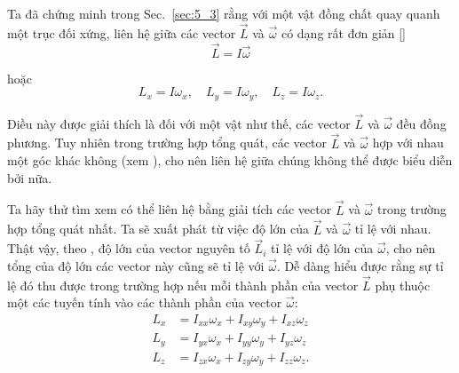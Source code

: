 Ta đã chứng minh trong Sec.~\ref{sec:5_3} rằng với một vật đồng chất quay quanh một trục đối xứng, liên hệ giữa các vector $\vec{L}$ và $\vec{\omega}$ có dạng rất đơn giản []
\begin{equation*}
\vec{L} = I\vec{\omega}
\end{equation*}

\noindent
hoặc
\begin{equation}\label{eq:5_29}
L_x = I\omega_x,\quad L_y = I\omega_y,\quad L_z = I\omega_z.
\end{equation}

\noindent
Điều này được giải thích là đối với một vật như thế, các vector $\vec{L}$ và $\vec{\omega}$ đều đồng phương. Tuy nhiên trong trường hợp tổng quát, các vector $\vec{L}$ và $\vec{\omega}$ hợp với nhau một góc khác không (xem ), cho nên liên hệ giữa chúng không thể được biểu diễn bởi  nữa.

Ta hãy thử tìm xem có thể liên hệ bằng giải tích các vector $\vec{L}$ và $\vec{\omega}$ trong trường hợp tổng quát nhất. Ta sẽ xuất phát từ việc độ lớn của $\vec{L}$ và $\vec{\omega}$ tỉ lệ với nhau. Thật vậy, theo , độ lớn của vector nguyên tố $\vec{L}_i$ tỉ lệ với độ lớn của $\vec{\omega}$, cho nên tổng của độ lớn các vector này cũng sẽ tỉ lệ với $\vec{\omega}$. Dễ dàng hiểu được rằng sự tỉ lệ đó thu được trong trường hợp nếu mỗi thành phần của vector $\vec{L}$ phụ thuộc một các tuyến tính vào các thành phần của vector $\vec{\omega}$:
\begin{align}
L_x &= I_{xx}\omega_x + I_{xy}\omega_y + I_{xz}\omega_z\nonumber\\
L_y &= I_{yx}\omega_x + I_{yy}\omega_y + I_{yz}\omega_z\label{eq:5_30}\\
L_z &= I_{zx}\omega_x + I_{zy}\omega_y + I_{zz}\omega_z.\nonumber
\end{align}

